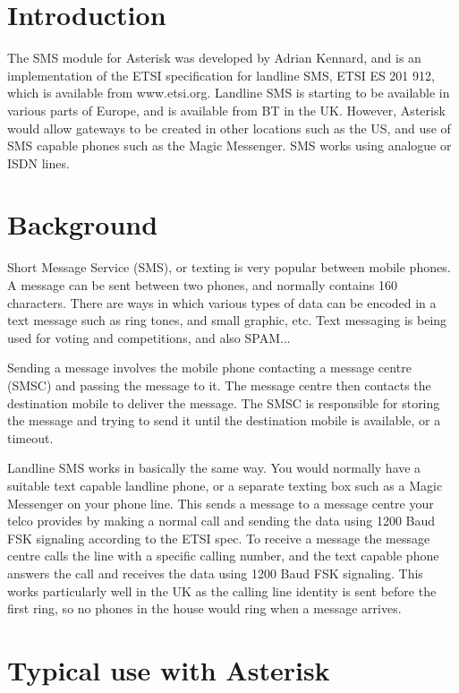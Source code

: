 \section{Introduction}

   The SMS module for Asterisk was developed by Adrian Kennard, and is an
   implementation of the ETSI specification for landline SMS, ETSI ES 201
   912, which is available from www.etsi.org. Landline SMS is starting to
   be available in various parts of Europe, and is available from BT in
   the UK. However, Asterisk would allow gateways to be created in other
   locations such as the US, and use of SMS capable phones such as the
   Magic Messenger. SMS works using analogue or ISDN lines.

\section{Background}

   Short Message Service (SMS), or texting is very popular between mobile
   phones. A message can be sent between two phones, and normally
   contains 160 characters. There are ways in which various types of data
   can be encoded in a text message such as ring tones, and small
   graphic, etc. Text messaging is being used for voting and
   competitions, and also SPAM...
   
   Sending a message involves the mobile phone contacting a message
   centre (SMSC) and passing the message to it. The message centre then
   contacts the destination mobile to deliver the message. The SMSC is
   responsible for storing the message and trying to send it until the
   destination mobile is available, or a timeout.
   
   Landline SMS works in basically the same way. You would normally have
   a suitable text capable landline phone, or a separate texting box such
   as a Magic Messenger on your phone line. This sends a message to a
   message centre your telco provides by making a normal call and sending
   the data using 1200 Baud FSK signaling according to the ETSI spec. To
   receive a message the message centre calls the line with a specific
   calling number, and the text capable phone answers the call and
   receives the data using 1200 Baud FSK signaling. This works
   particularly well in the UK as the calling line identity is sent
   before the first ring, so no phones in the house would ring when a
   message arrives.

\section{Typical use with Asterisk}

